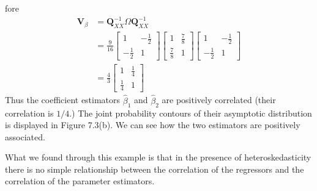\documentclass[10pt]{article}
\begin{document}
fore
$$
\begin{aligned}
\boldsymbol{V}_{\beta} &=\boldsymbol{Q}_{X X}^{-1} \Omega \boldsymbol{Q}_{X X}^{-1} \\
&=\frac{9}{16}\left[\begin{array}{cc}
1 & -\frac{1}{2} \\
-\frac{1}{2} & 1
\end{array}\right]\left[\begin{array}{cc}
1 & \frac{7}{8} \\
\frac{7}{8} & 1
\end{array}\right]\left[\begin{array}{cc}
1 & -\frac{1}{2} \\
-\frac{1}{2} & 1
\end{array}\right] \\
&=\frac{4}{3}\left[\begin{array}{cc}
1 & \frac{1}{4} \\
\frac{1}{4} & 1
\end{array}\right]
\end{aligned}
$$
Thus the coefficient estimators $\widehat{\beta}_{1}$ and $\widehat{\beta}_{2}$ are positively correlated (their correlation is $1 / 4$.) The joint probability contours of their asymptotic distribution is displayed in Figure 7.3(b). We can see how the two estimators are positively associated.

What we found through this example is that in the presence of heteroskedasticity there is no simple relationship between the correlation of the regressors and the correlation of the parameter estimators.
\end{document}
